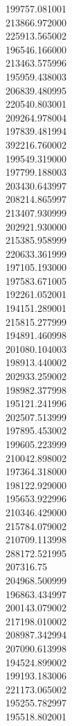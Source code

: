 199757.081001\\
213866.972000\\
225913.565002\\
196546.166000\\
213463.575996\\
195959.438003\\
206839.480995\\
220540.803001\\
209264.978004\\
197839.481994\\
392216.760002\\
199549.319000\\
197799.188003\\
203430.643997\\
208214.865997\\
213407.930999\\
202921.930000\\
215385.958999\\
220633.361999\\
197105.193000\\
197583.671005\\
192261.052001\\
194151.289001\\
215815.277999\\
194891.460998\\
201080.104003\\
198913.440002\\
202933.259002\\
198982.377998\\
195121.241996\\
202507.513999\\
197895.453002\\
199605.223999\\
210042.898002\\
197364.318000\\
198122.929000\\
195653.922996\\
210346.429000\\
215784.079002\\
210709.113998\\
288172.521995\\
207316.75\\
204968.500999\\
196863.434997\\
200143.079002\\
217198.010002\\
208987.342994\\
207090.613998\\
194524.899002\\
199193.183006\\
221173.065002\\
195255.782997\\
195518.802001\\
